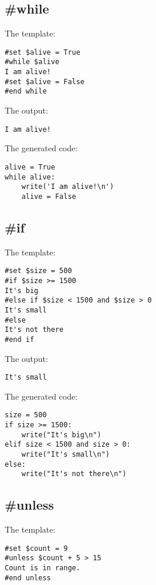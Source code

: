 \subsection{\#while}
\label{flowControl.while}

The template:
\begin{verbatim}
#set $alive = True
#while $alive
I am alive!
#set $alive = False
#end while
\end{verbatim}

The output:
\begin{verbatim}
I am alive!
\end{verbatim}

The generated code:
\begin{verbatim}
alive = True
while alive:
    write('I am alive!\n')
    alive = False
\end{verbatim}

\subsection{\#if}
\label{}

The template:
\begin{verbatim}
#set $size = 500
#if $size >= 1500
It's big
#else if $size < 1500 and $size > 0 
It's small
#else
It's not there
#end if
\end{verbatim}

The output:
\begin{verbatim}
It's small
\end{verbatim}

The generated code:
\begin{verbatim}
size = 500
if size >= 1500:
    write("It's big\n")
elif size < 1500 and size > 0:
    write("It's small\n")
else:
    write("It's not there\n")
\end{verbatim}


\subsection{\#unless}
\label{flowControl.unless}

The template:
\begin{verbatim}
#set $count = 9
#unless $count + 5 > 15
Count is in range.
#end unless
\end{verbatim}


